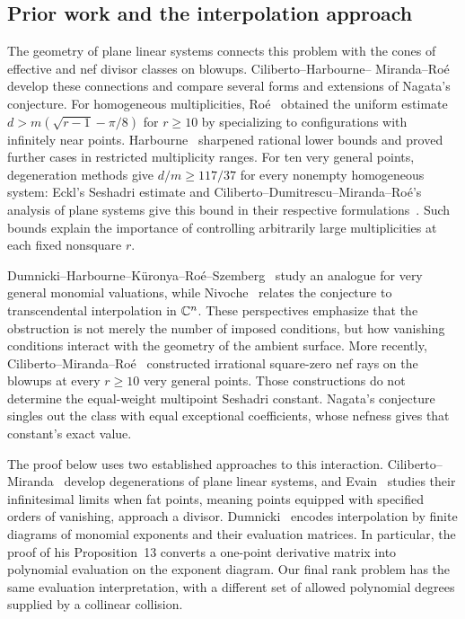 \subsection{Prior work and the interpolation approach}

The geometry of plane linear systems connects this problem with the cones
of effective and nef divisor classes on blowups. Ciliberto--Harbourne--
Miranda--Ro\'e~\cite{CHMR2012} develop these connections and compare
several forms and extensions of Nagata's conjecture.
For homogeneous multiplicities, Ro\'e~\cite{Roe2001} obtained the
uniform estimate $d>m(\sqrt{r-1}-\pi/8)$ for $r\ge10$ by
specializing to configurations with infinitely near points.
Harbourne~\cite{Harbourne2001} sharpened rational lower bounds and
proved further cases in restricted multiplicity ranges.
For ten very general points, degeneration methods give
$d/m\ge117/37$ for every nonempty homogeneous system: Eckl's Seshadri estimate and
Ciliberto--Dumitrescu--Miranda--Ro\'e's analysis of plane systems
give this bound in their respective formulations~\cite{Eckl2011,CDMR2011}.
Such bounds explain the importance of controlling arbitrarily large
multiplicities at each fixed nonsquare $r$.

Dumnicki--Harbourne--K\"uronya--Ro\'e--Szemberg~\cite{DHKRS2016}
study an analogue for very general monomial valuations, while
Nivoche~\cite{Nivoche2019} relates the conjecture to transcendental
interpolation in $\mathbb C^n$. These perspectives emphasize that the obstruction
is not merely the number of imposed conditions, but how vanishing
conditions interact with the geometry of the ambient surface.
More recently, Ciliberto--Miranda--Ro\'e~\cite[Theorem~1]{CMR2026}
constructed irrational square-zero nef rays on the blowups at every
$r\ge10$ very general points. Those constructions do not determine the
equal-weight multipoint Seshadri constant. Nagata's conjecture singles out
the class with equal exceptional coefficients, whose nefness gives that
constant's exact value.

The proof below uses two established approaches to this interaction.
Ciliberto--Miranda~\cite{CM1998} develop degenerations of plane linear
systems, and Evain~\cite{Evain2007} studies their infinitesimal limits
when fat points, meaning points equipped with specified orders of
vanishing, approach a divisor. Dumnicki~\cite{Dumnicki2007} encodes
interpolation by finite diagrams of monomial exponents and their
evaluation matrices. In particular, the proof of his Proposition~13 converts a
one-point derivative matrix into polynomial evaluation on the exponent
diagram. Our final rank problem has the same evaluation interpretation,
with a different set of allowed polynomial degrees supplied by a
collinear collision.

